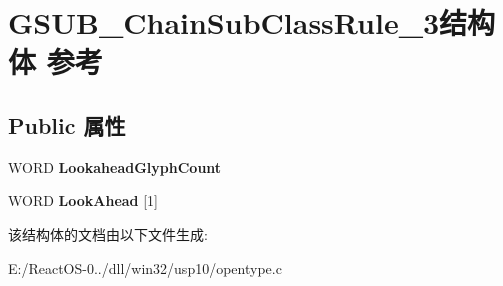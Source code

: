 \hypertarget{struct_g_s_u_b___chain_sub_class_rule__3}{}\section{G\+S\+U\+B\+\_\+\+Chain\+Sub\+Class\+Rule\+\_\+3结构体 参考}
\label{struct_g_s_u_b___chain_sub_class_rule__3}
\subsection*{Public 属性}
\begin{DoxyCompactItemize}
\item 
\mbox{\label{struct_g_s_u_b___chain_sub_class_rule__3_afebe49107df639e4dd3be3240083a590}} 
W\+O\+RD {\bfseries Lookahead\+Glyph\+Count}
\item 
\mbox{\label{struct_g_s_u_b___chain_sub_class_rule__3_a0aaf748bf830978a05d7849fd5b10981}} 
W\+O\+RD {\bfseries Look\+Ahead} \mbox{[}1\mbox{]}
\end{DoxyCompactItemize}


该结构体的文档由以下文件生成\+:\begin{DoxyCompactItemize}
\item 
E\+:/\+React\+O\+S-\/0../dll/win32/usp10/opentype.\+c\end{DoxyCompactItemize}
